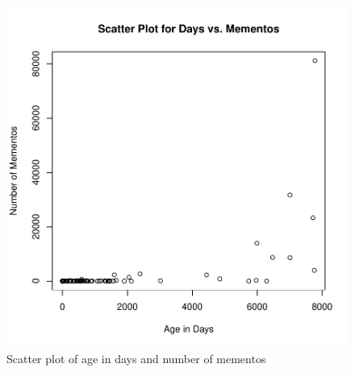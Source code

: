\documentclass[letterpaper,11pt]{article}
\begin{document}
\begin{figure}[h]
\centering
\includegraphics[scale=1.0]{ageuri.pdf}
\caption{Scatter plot of age in days and number of mementos}
\label{fig:scatterplot}
\end{figure}
\clearpage
\end{document}
